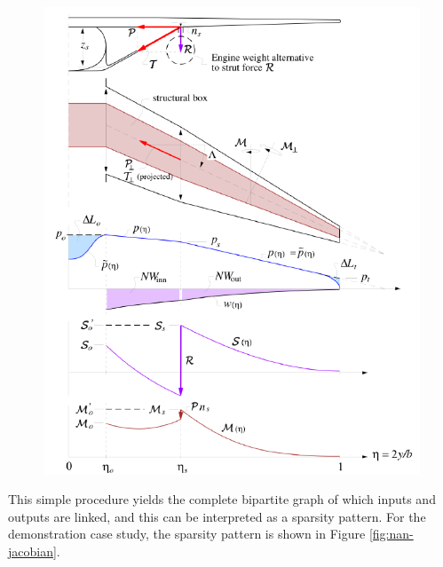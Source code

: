 \begin{figure}[H]
    \centering
    \includegraphics[page=4, width=5in]{../figures/nan-propagation/cropped.pdf}
\end{figure}

This simple procedure yields the complete bipartite graph of which inputs and outputs are linked, and this can be interpreted as a sparsity pattern. For the demonstration case study, the sparsity pattern is shown in Figure \ref{fig:nan-jacobian}.

